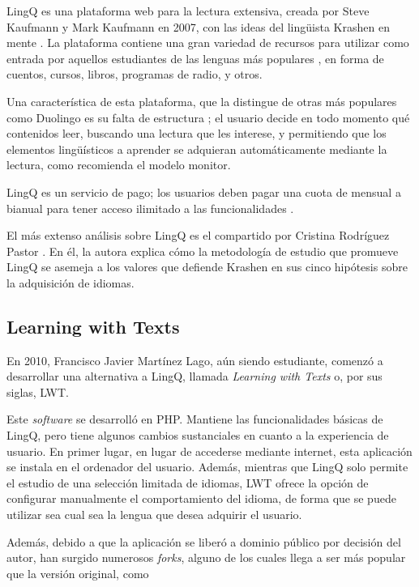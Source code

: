 LingQ es una plataforma web para la lectura extensiva, creada por Steve Kaufmann y Mark Kaufmann en 2007, con las ideas del lingüista Krashen en mente \autocite{LingQ}. La plataforma contiene una gran variedad de recursos para utilizar como entrada por aquellos estudiantes de las lenguas más populares \autocite{clara2025}, en forma de cuentos, cursos, libros, programas de radio, y otros.


Una característica de esta plataforma, que la distingue de otras más populares como Duolingo es su falta de estructura \autocite{Karasimos}; el usuario decide en todo momento qué contenidos leer, buscando una lectura que les interese, y permitiendo que los elementos lingüísticos a aprender se adquieran automáticamente mediante la lectura, como recomienda el modelo monitor.

LingQ es un servicio de pago; los usuarios deben pagar una cuota de mensual a bianual para tener acceso ilimitado a las funcionalidades \autocite{kabbasovna}.

El más extenso análisis sobre LingQ es el compartido por Cristina Rodríguez Pastor \autocite{Pastor_2022}. En él, la autora explica cómo la metodología de estudio que promueve LingQ se asemeja a los valores que defiende Krashen en sus cinco hipótesis sobre la adquisición de idiomas.

\subsection{Learning with Texts}

En 2010, Francisco Javier Martínez Lago, aún siendo estudiante, comenzó a desarrollar una alternativa a LingQ, llamada \textit{Learning with Texts} o, por sus siglas, LWT. \autocite{LWT}

Este \textit{software} se desarrolló en PHP. Mantiene las funcionalidades básicas de LingQ, pero tiene algunos cambios sustanciales en cuanto a la experiencia de usuario. En primer lugar, en lugar de accederse mediante internet, esta aplicación se instala en el ordenador del usuario. Además, mientras que LingQ solo permite el estudio de una selección limitada de idiomas, LWT ofrece la opción de configurar manualmente el comportamiento del idioma, de forma que se puede utilizar sea cual sea la lengua que desea adquirir el usuario.

Además, debido a que la aplicación se liberó a dominio público por decisión del autor, han surgido numerosos \textit{forks}, alguno de los cuales llega a ser más popular que la versión original, como

